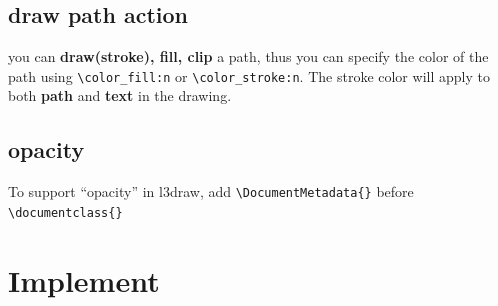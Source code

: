 \documentclass{article}
\begin{document}
\subsection{draw path action}
you can \textbf{draw(stroke), fill, clip} a path, thus you can specify the color of the path using
\verb|\color_fill:n| or \verb|\color_stroke:n|. The stroke color will apply to both \textbf{path} and 
\textbf{text} in the drawing.

\subsection{opacity}
To support ``opacity'' in l3draw, add \verb|\DocumentMetadata{}| before \verb|\documentclass{}|


\section{Implement}
\end{document}

